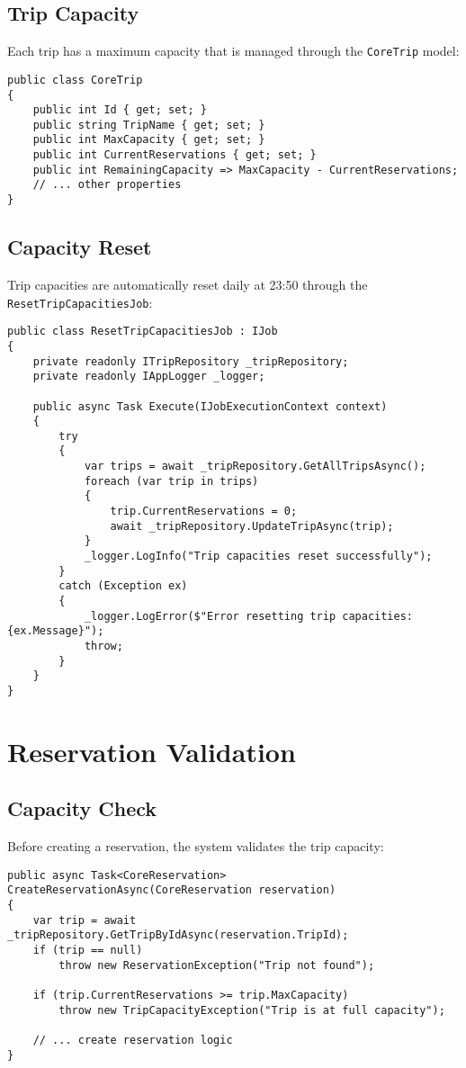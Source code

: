 \subsection{Trip Capacity}
Each trip has a maximum capacity that is managed through the \texttt{CoreTrip} model:

\begin{lstlisting}[language=CSharp]
public class CoreTrip
{
    public int Id { get; set; }
    public string TripName { get; set; }
    public int MaxCapacity { get; set; }
    public int CurrentReservations { get; set; }
    public int RemainingCapacity => MaxCapacity - CurrentReservations;
    // ... other properties
}
\end{lstlisting}

\subsection{Capacity Reset}
Trip capacities are automatically reset daily at 23:50 through the \texttt{ResetTripCapacitiesJob}:

\begin{lstlisting}[language=CSharp]
public class ResetTripCapacitiesJob : IJob
{
    private readonly ITripRepository _tripRepository;
    private readonly IAppLogger _logger;

    public async Task Execute(IJobExecutionContext context)
    {
        try
        {
            var trips = await _tripRepository.GetAllTripsAsync();
            foreach (var trip in trips)
            {
                trip.CurrentReservations = 0;
                await _tripRepository.UpdateTripAsync(trip);
            }
            _logger.LogInfo("Trip capacities reset successfully");
        }
        catch (Exception ex)
        {
            _logger.LogError($"Error resetting trip capacities: {ex.Message}");
            throw;
        }
    }
}
\end{lstlisting}

\section{Reservation Validation}

\subsection{Capacity Check}
Before creating a reservation, the system validates the trip capacity:

\begin{lstlisting}[language=CSharp]
public async Task<CoreReservation> CreateReservationAsync(CoreReservation reservation)
{
    var trip = await _tripRepository.GetTripByIdAsync(reservation.TripId);
    if (trip == null)
        throw new ReservationException("Trip not found");

    if (trip.CurrentReservations >= trip.MaxCapacity)
        throw new TripCapacityException("Trip is at full capacity");

    // ... create reservation logic
}
\end{lstlisting}

